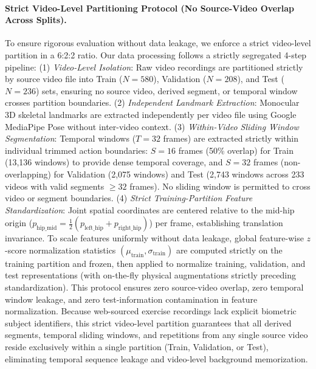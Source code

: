 \documentclass[runningheads]{llncs}
\begin{document}
\paragraph{Strict Video-Level Partitioning Protocol (No Source-Video Overlap Across Splits).} To ensure rigorous evaluation without data leakage, we enforce a strict video-level partition in a 6:2:2 ratio. Our data processing follows a strictly segregated 4-step pipeline: (1) \textit{Video-Level Isolation}: Raw video recordings are partitioned strictly by source video file into Train ($N=580$), Validation ($N=208$), and Test ($N=236$) sets, ensuring no source video, derived segment, or temporal window crosses partition boundaries. (2) \textit{Independent Landmark Extraction}: Monocular 3D skeletal landmarks are extracted independently per video file using Google MediaPipe Pose without inter-video context. (3) \textit{Within-Video Sliding Window Segmentation}: Temporal windows ($T = 32$ frames) are extracted strictly within individual trimmed action boundaries: $S = 16$ frames (50\% overlap) for Train (13,136 windows) to provide dense temporal coverage, and $S = 32$ frames (non-overlapping) for Validation (2,075 windows) and Test (2,743 windows across 233 videos with valid segments $\ge 32$ frames). No sliding window is permitted to cross video or segment boundaries. (4) \textit{Strict Training-Partition Feature Standardization}: Joint spatial coordinates are centered relative to the mid-hip origin ($p_{\text{hip\_mid}} = \frac{1}{2}(p_{\text{left\_hip}} + p_{\text{right\_hip}})$) per frame, establishing translation invariance. To scale features uniformly without data leakage, global feature-wise $z$-score normalization statistics $(\mu_{\text{train}}, \sigma_{\text{train}})$ are computed strictly on the training partition and frozen, then applied to normalize training, validation, and test representations (with on-the-fly physical augmentations strictly preceding standardization). This protocol ensures zero source-video overlap, zero temporal window leakage, and zero test-information contamination in feature normalization. Because web-sourced exercise recordings lack explicit biometric subject identifiers, this strict video-level partition guarantees that all derived segments, temporal sliding windows, and repetitions from any single source video reside exclusively within a single partition (Train, Validation, or Test), eliminating temporal sequence leakage and video-level background memorization.
\end{document}
